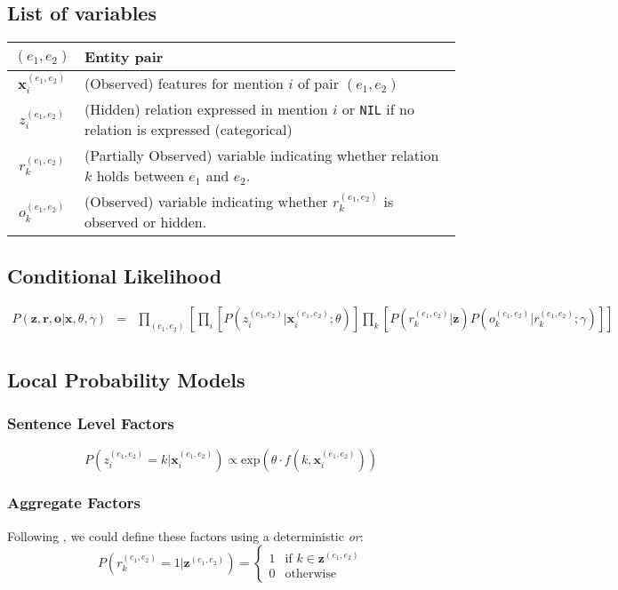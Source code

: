 \documentclass[12pt]{article}
\begin{document}
\subsection{List of variables}
\begin{center}
\begin{tabular}{|c|p{4in}|}
\hline
$(e_1,e_2)$ & Entity pair \\
\hline
$\mathbf{x}^{(e_1,e_2)}_i$ & (Observed) features for mention $i$ of pair $(e_1,e_2)$ \\
\hline
$z^{(e_1,e_2)}_i$ & (Hidden) relation expressed in mention $i$ or {\tt NIL} if no relation is expressed (categorical) \\
\hline
$r^{(e_1,e_2)}_k$ & (Partially Observed) variable indicating whether relation $k$ holds between $e_1$ and $e_2$. \\
\hline
$o^{(e_1,e_2)}_k$ & (Observed) variable indicating whether $r^{(e_1,e_2)}_k$ is observed or hidden. \\
\hline
\end{tabular}
\end{center}

\subsection{Conditional Likelihood}
\label{conditional_likelihood}
\begin{eqnarray*}
  P(\mathbf{z}, \mathbf{r}, \mathbf{o}|\mathbf{x},\theta,\gamma) & = & \prod_{(e_1,e_2)} \left[ \prod_i \left[ P(z^{(e_1,e_2)}_i|\mathbf{x}^{(e_1,e_2)}_i;\theta) \right] \prod_{k} \left[P(r^{(e_1,e_2)}_k|\mathbf{z}) P(o^{(e_1,e_2)}_k|r^{(e_1,e_2)}_k;\gamma) \right] \right]\\
\end{eqnarray*}

\subsection{Local Probability Models}
\subsubsection{Sentence Level Factors}
\[
P(z^{(e_1,e_2)}_i=k|\mathbf{x}^{(e_1,e_2)}_i) \propto \text{exp}\left(\theta \cdot f(k,\mathbf{x}^{(e_1,e_2)}_i)\right)
\]

\subsubsection{Aggregate Factors}
Following \cite{Hoffmann11}, we could define these factors using a deterministic \emph{or}:
\[
P(r^{(e_1,e_2)}_k=1|\mathbf{z}^{(e_1,e_2)}) =
\left\{
\begin{array}{ll}
  1  & \mbox{if } k \in \mathbf{z}^{(e_1,e_2)} \\
  0 & \mbox{otherwise } 
  \end{array}
\right.
\]
\end{document}
